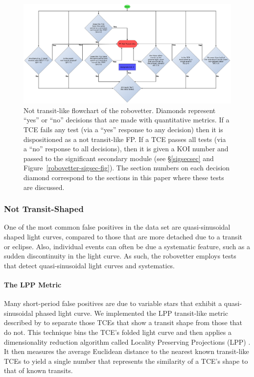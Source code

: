 \begin{figure}[ht]
\centering
\includegraphics[width=\linewidth]{RoboVetter-Diagram-V4-TransitLike.pdf}
\caption{Not transit-like flowchart of the robovetter. Diamonds represent ``yes'' or ``no'' decisions that are made with quantitative metrics. If a TCE fails any test (via a ``yes'' response to any decision) then it is dispositioned as a not transit-like FP. If a TCE passes all tests (via a ``no'' response to all decisions), then it is given a KOI number and passed to the significant secondary module (see \S\ref{sigsecsec} and Figure~\ref{robovetter-sigsec-fig}). The section numbers on each decision diamond correspond to the sections in this paper where these tests are discussed.}
\label{robovetter-transitlike-fig}
\end{figure}


\subsubsection{Not Transit-Shaped}

One of the most common false positives in the data set are quasi-sinusoidal shaped light curves, compared to those that are more detached due to a transit or eclipse. Also, individual events can often be due a systematic feature, such as a sudden discontinuity in the light curve. As such, the robovetter employs tests that detect quasi-sinusoidal light curves and systematics.


\paragraph{The LPP Metric}
\label{lppsec}

Many short-period false positives are due to variable stars that exhibit a quasi-sinusoidal phased light curve. We implemented the LPP transit-like metric described by \citet{Thompson2015b} to separate those TCEs that show a transit shape from those that do not. This technique bins the TCE's folded light curve and then applies a dimensionality reduction algorithm called Locality Preserving Projections (LPP) \citep{}.  It then measures the average Euclidean distance to the nearest known transit-like TCEs to yield a single number that represents the similarity of a TCE's shape to that of known transits. 

